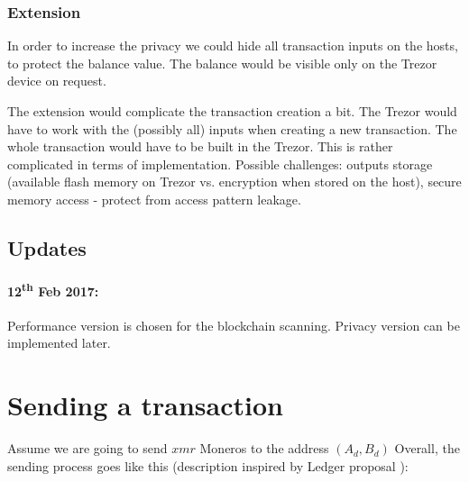 \documentclass[]{article}
\begin{document}
\subsubsection{Extension} In order to increase the privacy we could hide all transaction inputs on the hosts, to protect the balance value. The balance would be visible only on the Trezor device on request.

The extension would complicate the transaction creation a bit. The Trezor would have to work with the (possibly all) inputs when creating a new transaction. The whole transaction would have to be built in the Trezor. This is rather complicated in terms of implementation. Possible challenges: outputs storage (available flash memory on Trezor vs. encryption when stored on the host), secure memory access - protect from access pattern leakage.

\subsection{Updates}

\paragraph{12\textsuperscript{th} Feb 2017:} Performance version is chosen for the blockchain scanning. Privacy version can be implemented later.

\section{Sending a transaction}
Assume we are going to send $xmr$ Moneros to the address $(A_d, B_d)$
Overall, the sending process goes like this (description inspired by Ledger proposal \cite{ledger_doc}):
\end{document}
